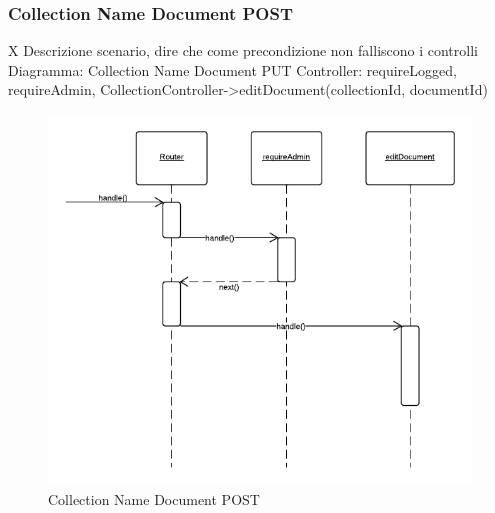 \subsubsection{Collection Name Document POST} X
Descrizione scenario, dire che come precondizione non falliscono i controlli
Diagramma: Collection Name Document PUT
Controller: requireLogged, requireAdmin, CollectionController->editDocument(collectionId, documentId)
\begin{figure}[H]
	\begin{center} 
		\includegraphics[scale=0.60]{scenari/Collection Name Document POST.png} 
		\caption{Collection Name Document POST}
	\end{center} 
\end{figure}

